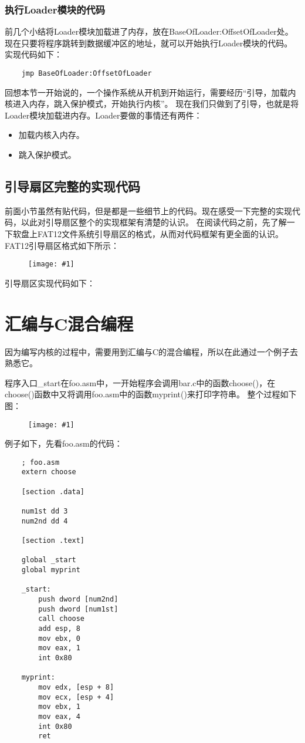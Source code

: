 \documentclass[a4paper,left=2.5cm,right=2.5cm,11pt]{article}
\newcommand{\fic}[1]{\begin{figure}[H]
		\center
		\texttt{[image: \#1]}
	\end{figure}}
\newcommand{\codefile}[1]{}
\begin{document}
\subsubsection{执行Loader模块的代码}
	前几个小结将Loader模块加载进了内存，放在BaseOfLoader:OffsetOfLoader处。现在只要将程序跳转到数据缓冲区的地址，就可以开始执行Loader模块的代码。
	实现代码如下：
	\begin{lstlisting}
	jmp BaseOfLoader:OffsetOfLoader
	\end{lstlisting}

	回想本节一开始说的，一个操作系统从开机到开始运行，需要经历“引导，加载内核进入内存，跳入保护模式，开始执行内核”。
	现在我们只做到了引导，也就是将Loader模块加载进内存。Loader要做的事情还有两件：
	\begin{itemize}
		\item 加载内核入内存。
		\item 跳入保护模式。
	\end{itemize}

\subsection{引导扇区完整的实现代码}
	前面小节虽然有贴代码，但是都是一些细节上的代码。现在感受一下完整的实现代码，以此对引导扇区整个的实现框架有清楚的认识。
	在阅读代码之前，先了解一下软盘上FAT12文件系统引导扇区的格式，从而对代码框架有更全面的认识。FAT12引导扇区格式如下所示：
	\fic{4.png}
	
	引导扇区实现代码如下：
	\codefile{boot.asm}

\clearpage

\section{汇编与C混合编程}
	因为编写内核的过程中，需要用到汇编与C的混合编程，所以在此通过一个例子去熟悉它。\par
	程序入口\_start在foo.asm中，一开始程序会调用bar.c中的函数choose()，在choose()函数中又将调用foo.asm中的函数myprint()来打印字符串。
	整个过程如下图：
	\fic{5.png}

	例子如下，先看foo.asm的代码：
	\begin{lstlisting}
	; foo.asm
	extern choose

	[section .data]

	num1st dd 3
	num2nd dd 4

	[section .text]

	global _start
	global myprint

	_start:
		push dword [num2nd]
		push dword [num1st]
		call choose
		add esp, 8
		mov ebx, 0
		mov eax, 1
		int 0x80
	
	myprint:
		mov edx, [esp + 8]
		mov ecx, [esp + 4]
		mov ebx, 1
		mov eax, 4
		int 0x80
		ret
	\end{lstlisting}
\end{document}
